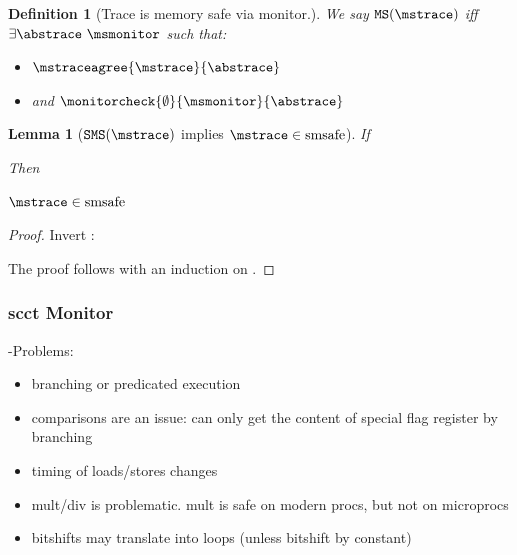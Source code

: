 \documentclass[a4paper,names,dvipsnames]{article}
\newtheorem{definition}{Definition}
\newtheorem{lemma}{Lemma}
\begin{document}
\begin{definition}[Trace is memory safe via monitor.]\label{def:src:trace:ms}
  We say $\texttt{MS}(\mstrace)$ iff $\exists \abstrace\ \msmonitor$ such that:
  \begin{itemize}
    \item $\mstraceagree{\mstrace}{\abstrace}$
    \item and $\monitorcheck{\emptyset}{\msmonitor}{\abstrace}$
  \end{itemize}
\end{definition}

\begin{lemma}[$\texttt{SMS}(\mstrace)$ implies $\mstrace\in\operatorname{smsafe}$]\label{lem:smssafe-tracesms}
  If
  Then
  \begin{goals}
    \item $\mstrace\in\operatorname{smsafe}$
  \end{goals}
\end{lemma}
\begin{proof}
  Invert :
  The proof follows with an induction on .
\end{proof}

\subsubsection{\gls*{scct} Monitor}
\sCCT-Problems:
\begin{itemize}
  \item branching or predicated execution
  \item comparisons are an issue: can only get the content of special flag register by branching
  \item timing of loads/stores changes
  \item mult/div is problematic. mult is safe on modern procs, but not on microprocs
  \item bitshifts may translate into loops (unless bitshift by constant)
\end{itemize}
\end{document}
